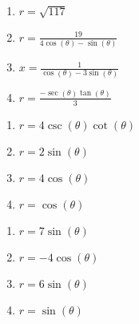 \begin{multicols}{4}

\begin{enumerate}

\setcounter{enumi}{\value{HW}}

\item $r = \sqrt{117}$
\item $r = \frac{19}{4\cos(\theta) - \sin(\theta)}$
\item $x = \frac{1}{\cos(\theta) - 3\sin(\theta)}$
\item \small $r = \frac{-\sec(\theta)\tan(\theta)}{3}$ \normalsize

\setcounter{HW}{\value{enumi}}

\end{enumerate}

\end{multicols}

\begin{multicols}{4}

\begin{enumerate}

\setcounter{enumi}{\value{HW}}

\item \small $r = 4\csc(\theta)\cot(\theta)$ \normalsize
\item $r=2\sin(\theta)$
\item $r = 4\cos(\theta)$
\item $r = \cos(\theta)$

\setcounter{HW}{\value{enumi}}

\end{enumerate}

\end{multicols}

\begin{multicols}{4}

\begin{enumerate}

\setcounter{enumi}{\value{HW}}

\item $r = 7\sin(\theta)$
\item $r= -4\cos(\theta)$
\item $r = 6\sin(\theta)$
\item $r = \sin(\theta)$

\setcounter{HW}{\value{enumi}}

\end{enumerate}

\end{multicols}

